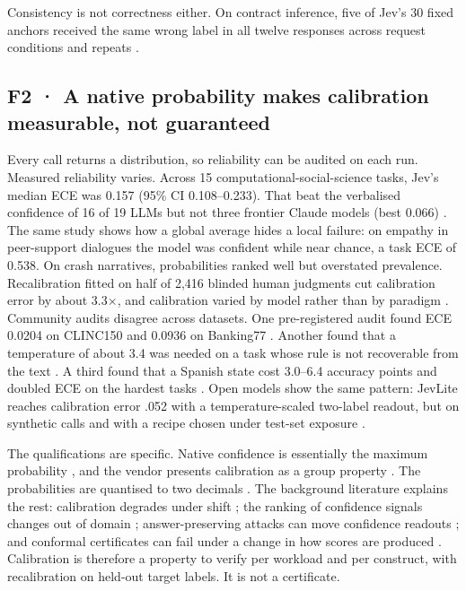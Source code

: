 Consistency is not correctness either. On contract inference, five of Jev's 30 fixed anchors received the same wrong label in all twelve responses across request conditions and repeats \citep{arxiv2609_27678}.

\subsection{F2 · A native probability makes calibration measurable, not guaranteed}

Every call returns a distribution, so reliability can be audited on each run. Measured reliability varies. Across 15 computational-social-science tasks, Jev's median ECE was 0.157 (95\% CI 0.108–0.233). That beat the verbalised confidence of 16 of 19 LLMs but not three frontier Claude models (best 0.066) \citep{arxiv2609_24574}. The same study shows how a global average hides a local failure: on empathy in peer-support dialogues the model was confident while near chance, a task ECE of 0.538. On crash narratives, probabilities ranked well but overstated prevalence. Recalibration fitted on half of 2,416 blinded human judgments cut calibration error by about 3.3×, and calibration varied by model rather than by paradigm \citep{arxiv2609_24052}. Community audits disagree across datasets. One pre-registered audit found ECE 0.0204 on CLINC150 and 0.0936 on Banking77 \citep{gh_jourdanlabs_assay_001}. Another found that a temperature of about 3.4 was needed on a task whose rule is not recoverable from the text \citep{gh_scienthoon_jev_ood_calibration}. A third found that a Spanish state cost 3.0–6.4 accuracy points and doubled ECE on the hardest tasks \citep{gh_marcosmartinez_jev_acento}. Open models show the same pattern: JevLite reaches calibration error .052 with a temperature-scaled two-label readout, but on synthetic calls and with a recipe chosen under test-set exposure \citep{arxiv2609_23959}.

The qualifications are specific. Native confidence is essentially the maximum probability \citep{arxiv2609_26550}, and the vendor presents calibration as a group property \citep{typesafe2026systemone}. The probabilities are quantised to two decimals \citep{arxiv2609_24052}. The background literature explains the rest: calibration degrades under shift \citep{arxiv1906_02530}; the ranking of confidence signals changes out of domain \citep{arxiv2608_19558}; answer-preserving attacks can move confidence readouts \citep{arxiv2608_06571}; and conformal certificates can fail under a change in how scores are produced \citep{arxiv2609_04445}. Calibration is therefore a property to verify per workload and per construct, with recalibration on held-out target labels. It is not a certificate.

